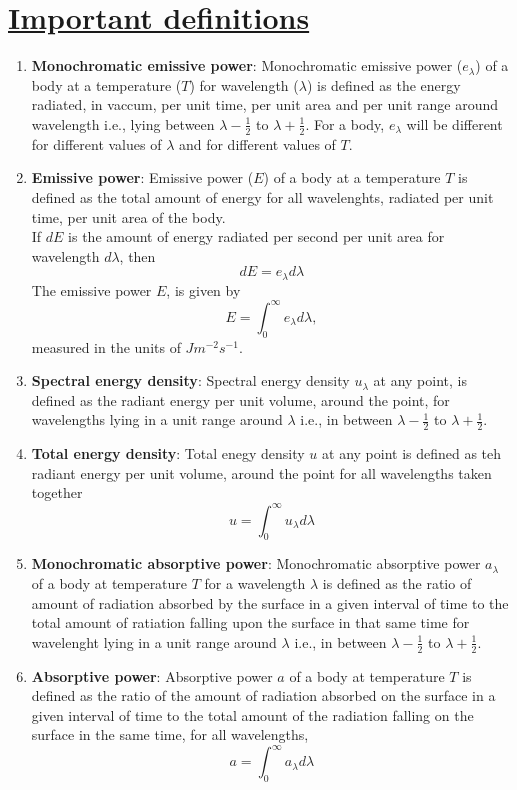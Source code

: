 \documentclass[14pt,a4paper]{article}
\begin{document}
\section{\underline{Important definitions }}
\begin{enumerate}
	\item \textbf{Monochromatic emissive power}: Monochromatic emissive power ($e_{\lambda}$) of a body at a temperature ($T$) for wavelength ($\lambda$) is defined as the energy radiated, in vaccum, per unit time, per unit area and per unit range around wavelength i.e., lying between $\lambda-\frac{1}{2}$ to $\lambda+\frac{1}{2}$. For a body, $e_{\lambda}$ will be different for different values of $\lambda$ and for different values of $T$.
	\item \textbf{Emissive power}: Emissive power ($E$) of a body at a temperature $T$ is defined as the total amount of energy for all wavelenghts, radiated per unit time, per unit area of the body.
	\\
	If $dE$ is the amount of energy radiated per second per unit area for wavelength $d\lambda$, then
	\begin{equation}
		dE = e_{\lambda}d\lambda
	\end{equation}
	The emissive power $E$, is given by
	\begin{equation}
		E = \int_{0}^{\infty} e_{\lambda}d\lambda,
	\end{equation}
	measured in the units of $Jm^{-2}s^{-1}$.
	
	\item \textbf{Spectral energy density}: Spectral energy density $u_{\lambda}$ at any point, is defined as the radiant energy per unit volume, around the point, for wavelengths lying in a unit range around $\lambda$ i.e., in between $\lambda-\frac{1}{2}$ to $\lambda+\frac{1}{2}$.
	\item \textbf{Total energy density}: Total enegy density $u$ at any point is defined as teh radiant energy per unit volume, around the point for all wavelengths taken together
	\begin{equation}
		u = \int_{0}^{\infty} u_{\lambda}d\lambda
	\end{equation}
	
	\item \textbf{Monochromatic absorptive power}: Monochromatic absorptive power $a_{\lambda}$ of a body at temperature $T$ for a wavelength $\lambda$ is defined as the ratio of amount of radiation absorbed by the surface in a given interval of time to the total amount of ratiation falling upon the surface in that same time for wavelenght lying in a unit range around $\lambda$ i.e., in between $\lambda-\frac{1}{2}$ to $\lambda+\frac{1}{2}$.
	\item \textbf{Absorptive power}: Absorptive power $a$ of a body at temperature $T$ is defined as the ratio of the amount of radiation absorbed on the surface in a given interval of time to the total amount of the radiation falling on the surface in the same time, for all wavelengths,
	\begin{equation}
		a = \int_{0}^{\infty}a_{\lambda}d\lambda
	\end{equation}
	
\end{enumerate}
	
\end{document}
